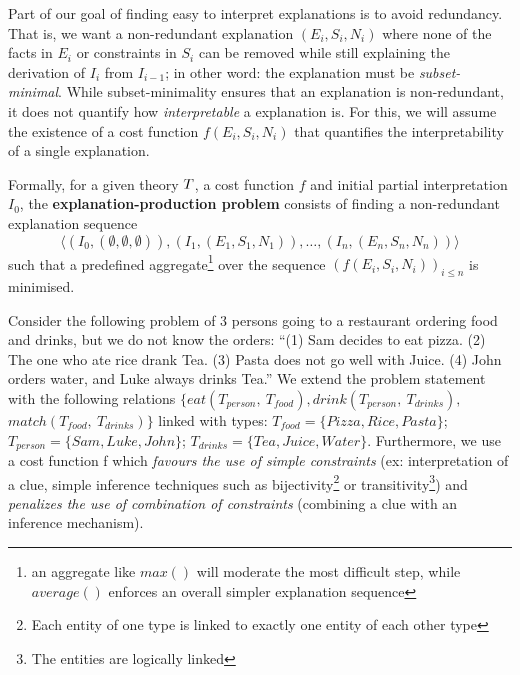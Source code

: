 Part of our goal of finding easy to interpret explanations is to avoid redundancy.
That is, we want a non-redundant explanation $(E_i,S_i,N_i)$ where none of the facts in $E_i$ or constraints in $S_i$ can be removed while still explaining the derivation of $I_i$ from $I_{i-1}$; in other word: the explanation must be \textit{subset-minimal}.
While subset-minimality ensures that an explanation is non-redundant, it does not quantify how \textit{interpretable} a explanation is.
For this, we will assume the existence of a cost function $f(E_i,S_i,N_i)$ that quantifies the interpretability of a single explanation.

Formally, for a given theory $T$, a cost function $f$ and initial partial interpretation $I_0$, the \textbf{explanation-production problem} consists of finding a non-redundant explanation sequence
\[\langle(I_0,(\emptyset,\emptyset,\emptyset)), (I_1,(E_1,S_1,N_1)), \dots ,(I_n,(E_n,S_n,N_n))\rangle\]
such that a predefined aggregate\footnote{an aggregate like $max()$ will moderate the most difficult step, while $average()$ enforces an overall simpler explanation sequence} over the sequence $\left(f(E_i,S_i,N_i)\right)_{i\leq n}$ is minimised.

Consider the following problem of 3 persons going to a restaurant ordering food and drinks, but we do not know the orders: ``(1) Sam decides to eat pizza. (2) The one who ate rice drank Tea. (3) Pasta does not go well with Juice. (4) John orders water, and Luke always drinks Tea.'' We extend the problem statement with the following relations $\{ eat(T_{person},\ T_{food}), drink(T_{person},\  T_{drinks}),$ $match(T_{food},\ T_{drinks})\}$ linked with types: $T_{food}= \{Pizza,  Rice,  Pasta\}$;\\ $T_{person}= \{ Sam, Luke,John\}$; $T_{drinks}= \{ Tea,  Juice,  Water\}$.
Furthermore, we use a cost function f which \textit{favours the use of simple constraints} (ex: interpretation of a clue, simple inference techniques such as bijectivity\footnote{Each entity of one type is linked to exactly one entity of each other type} or transitivity\footnote{The entities are logically linked}) and \textit{penalizes the use of combination of constraints} (combining a clue with an inference mechanism). 

